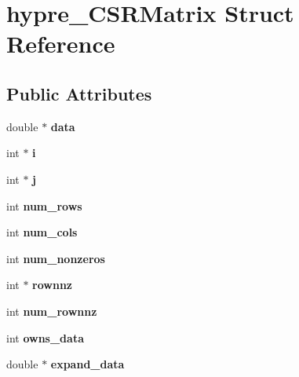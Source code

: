 \hypertarget{structhypre__CSRMatrix}{}\section{hypre\+\_\+\+C\+S\+R\+Matrix Struct Reference}
\label{structhypre__CSRMatrix}
\subsection*{Public Attributes}
\begin{DoxyCompactItemize}
\item 
\hypertarget{structhypre__CSRMatrix_af54442d60d3f6921898c79d7a123507a}{}double $\ast$ {\bfseries data}\label{structhypre__CSRMatrix_af54442d60d3f6921898c79d7a123507a}

\item 
\hypertarget{structhypre__CSRMatrix_a2b46d28ae60cc4b3fdaa978593708ad9}{}int $\ast$ {\bfseries i}\label{structhypre__CSRMatrix_a2b46d28ae60cc4b3fdaa978593708ad9}

\item 
\hypertarget{structhypre__CSRMatrix_a7f7335e88b9dc9999f09138151f6c4b0}{}int $\ast$ {\bfseries j}\label{structhypre__CSRMatrix_a7f7335e88b9dc9999f09138151f6c4b0}

\item 
\hypertarget{structhypre__CSRMatrix_a3c1361629d8dca52c97b5803f2abe156}{}int {\bfseries num\+\_\+rows}\label{structhypre__CSRMatrix_a3c1361629d8dca52c97b5803f2abe156}

\item 
\hypertarget{structhypre__CSRMatrix_a33db45f28986554ec46ee798167aab4a}{}int {\bfseries num\+\_\+cols}\label{structhypre__CSRMatrix_a33db45f28986554ec46ee798167aab4a}

\item 
\hypertarget{structhypre__CSRMatrix_a1581a6913d982cba99579a1faccaadfe}{}int {\bfseries num\+\_\+nonzeros}\label{structhypre__CSRMatrix_a1581a6913d982cba99579a1faccaadfe}

\item 
\hypertarget{structhypre__CSRMatrix_ac897091a0e428c5c291392982926b0a2}{}int $\ast$ {\bfseries rownnz}\label{structhypre__CSRMatrix_ac897091a0e428c5c291392982926b0a2}

\item 
\hypertarget{structhypre__CSRMatrix_af5eff489dc0a8d7c2f429f92d68576c8}{}int {\bfseries num\+\_\+rownnz}\label{structhypre__CSRMatrix_af5eff489dc0a8d7c2f429f92d68576c8}

\item 
\hypertarget{structhypre__CSRMatrix_a027bf74b4897162e020c34cb6fc12a45}{}int {\bfseries owns\+\_\+data}\label{structhypre__CSRMatrix_a027bf74b4897162e020c34cb6fc12a45}

\item 
\hypertarget{structhypre__CSRMatrix_a64afd89171e3872e4d7eb962b6c7a7b9}{}double $\ast$ {\bfseries expand\+\_\+data}\label{structhypre__CSRMatrix_a64afd89171e3872e4d7eb962b6c7a7b9}

\end{DoxyCompactItemize}


